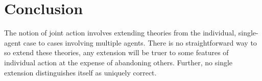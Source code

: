 \documentclass[12pt,a4paper]{extarticle}
\begin{document}
\section{Conclusion}
The notion of joint action involves extending theories from the individual, single-agent case to cases involving multiple agents.  There is no straightforward way to so extend these theories, any extension will be truer to some features of individual action at the expense of abandoning others.  Further, no single extension distinguishes itself as uniquely correct.

 


\end{document}
